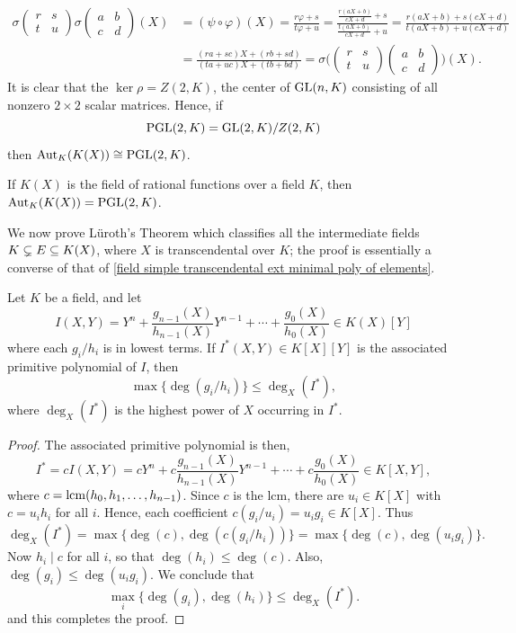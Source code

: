 \begin{align*}
\sigma\begin{pmatrix}
r&s\\
t&u
\end{pmatrix}\sigma\begin{pmatrix}
a&b\\
c&d
\end{pmatrix}(X)&=(\psi\circ\varphi)(X)=\frac{r\varphi+s}{t\varphi+u}=\frac{\frac{r(aX+b)}{cX+d}+s}{\frac{t(aX+b)}{cX+d}+u}=\frac{r(aX+b)+s(cX+d)}{t(aX+b)+u(cX+d)}\\
&=\frac{(ra+sc)X+(rb+sd)}{(ta+uc)X+(tb+bd)}=\sigma\Big(\begin{pmatrix}
r&s\\
t&u
\end{pmatrix}\begin{pmatrix}
a&b\\
c&d
\end{pmatrix}\Big)(X).
\end{align*}
It is clear that the $\ker\rho=Z(2,K)$, the center of $\mathrm{GL}(n,K)$ consisting of all nonzero $2\times 2$ scalar matrices. Hence, if
\[\mathrm{PGL}(2,K)=\mathrm{GL}(2,K)/Z(2,K)\]
then $\mathrm{Aut}_K(K(X))\cong\mathrm{PGL}(2,K)$.
\begin{corollary}
If $K(X)$ is the field of rational functions over a field $K$, then $\mathrm{Aut}_K(K(X))=\mathrm{PGL}(2,K)$.
\end{corollary}
We now prove L\"uroth's Theorem which classifies all the intermediate fields $K\subsetneq E\subseteq K(X)$, where $X$ is transcendental over $K$; the proof is essentially a converse of that of \cref{field simple transcendental ext minimal poly of elements}.
\begin{lemma}\label{Luroth's Theorem lemma}
Let $K$ be a field, and let
\[I(X,Y)=Y^n+\frac{g_{n-1}(X)}{h_{n-1}(X)}Y^{n-1}+\cdots+\frac{g_0(X)}{h_0(X)}\in K(X)[Y]\]
where each $g_i/h_i$ is in lowest terms. If $I^*(X,Y)\in K[X][Y]$ is the associated primitive polynomial of $I$, then
\[\max\{\deg(g_i/h_i)\}\leq\deg_X(I^*),\]
where $\deg_X(I^*)$ is the highest power of $X$ occurring in $I^*$.
\end{lemma}
\begin{proof}
The associated primitive polynomial is then,
\[I^*=cI(X,Y)=cY^n+c\frac{g_{n-1}(X)}{h_{n-1}(X)}Y^{n-1}+\cdots+c\frac{g_0(X)}{h_0(X)}\in K[X,Y],\]
where $c=\mathrm{lcm}(h_0,h_1,\dots,h_{n-1})$. Since $c$ is the lcm, there are $u_i\in K[X]$ with $c=u_ih_i$ for all $i$. Hence, each coefficient $c(g_i/u_i)=u_ig_i\in K[X]$. Thus
\[\deg_X(I^*)=\max\{\deg(c),\deg(c(g_i/h_i))\}=\max\{\deg(c),\deg(u_ig_i)\}.\]
Now $h_i\mid c$ for all $i$, so that $\deg(h_i)\leq\deg(c)$. Also, $\deg(g_i)\leq\deg(u_ig_i)$. We conclude that
\[\max_i\{\deg(g_i),\deg(h_i)\}\leq\deg_X(I^*).\]
and this completes the proof.
\end{proof}

